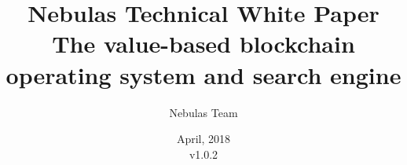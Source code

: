 \documentclass[11.5pt]{article}
\begin{document}
\renewcommand{\contentsname}{Contents}
\renewcommand{\abstractname}{Abstract}
\renewcommand{\refname}{References}
\renewcommand{\nomname}{Glossaries}
\renewcommand{\figurename}{Fig.}
\renewcommand{\tablename}{Table}
\renewcommand{\baselinestretch}{1.5}
\renewcommand{\appendixname}{Appendix}

\title{
	Nebulas Technical White Paper \\
	\large The value-based blockchain operating system and search engine}
\author{Nebulas Team}
\date{April, 2018\\v1.0.2}

\maketitle

\newpage

\tableofcontents

\printnomenclature


\newpage

\newpage

\newpage

\newpage

\newpage

\newpage

\newpage

\newpage

\newpage

\printbibliography

\begin{appendices}


\end{appendices}

%
\end{document}
